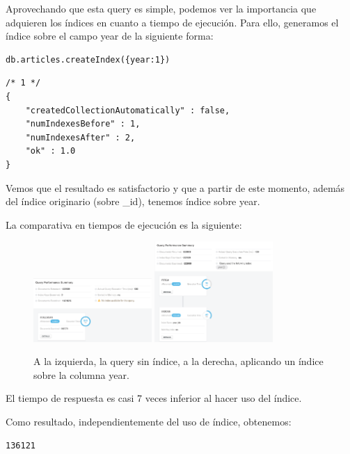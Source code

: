 Aprovechando que esta query es simple, podemos ver la importancia que adquieren los índices en cuanto a tiempo de ejecución. Para ello, generamos el índice sobre el campo year de la siguiente forma:

\begin{verbatim}
db.articles.createIndex({year:1})
\end{verbatim}


\begin{verbatim}
/* 1 */
{
    "createdCollectionAutomatically" : false,
    "numIndexesBefore" : 1,
    "numIndexesAfter" : 2,
    "ok" : 1.0
}
\end{verbatim}

Vemos que el resultado es satisfactorio y que a partir de este momento, además del índice originario (sobre \_id), tenemos índice sobre year.

La comparativa en tiempos de ejecución es la siguiente:

\begin{figure}[H]
  \centering
    \centering
        \includegraphics[width=0.4\textwidth]{Figures/wo_year_idx}
        \includegraphics[width=0.4\textwidth]{Figures/year_idx}
  \caption{A la izquierda, la query sin índice, a la derecha, aplicando un índice sobre la columna year.}
\end{figure}

El tiempo de respuesta es casi 7 veces inferior al hacer uso del índice.

Como resultado, independientemente del uso de índice, obtenemos:

\begin{verbatim}
136121
\end{verbatim}

